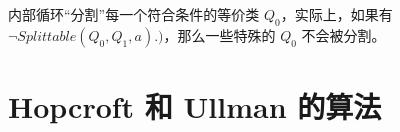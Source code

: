 \newpage
内部循环“分割”每一个符合条件的等价类 $Q_0$，实际上，如果有$\neg Splittable(Q_0,Q_1,a).)$，那么一些特殊的 $Q_0$ 不会被分割。

\section{Hopcroft 和 Ullman 的算法 }


